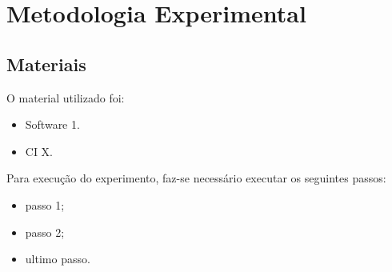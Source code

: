 \newpage
\section{Metodologia Experimental}

\subsection{Materiais}

O material utilizado foi:

\begin{itemize}
\item Software 1.
\item CI X.
\end{itemize}

Para execução do experimento, faz-se necessário executar os seguintes passos:

\begin{itemize}
\item passo 1;
\item passo 2;
\item ultimo passo.
\end{itemize}
